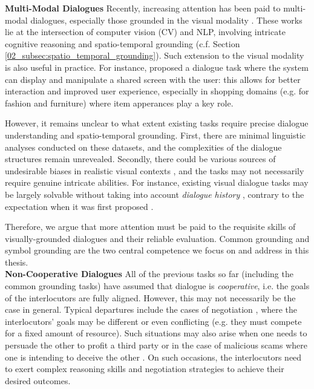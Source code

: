 \noindent
\textbf{Multi-Modal Dialogues}\quad
Recently, increasing attention has been paid to multi-modal dialogues, especially those grounded in the visual modality \citep{das2017visual,de2017guesswhat,alamri2019audio}. These works lie at the intersection of computer vision (CV) and NLP, involving intricate cognitive reasoning \citep{zellers2019recognition} and spatio-temporal grounding (c.f. Section \ref{02_subsec:spatio_temporal_grounding}). Such extension to the visual modality is also useful in practice. For instance, \citet{moon-etal-2020-situated} proposed a dialogue task where the system can display and manipulate a shared screen with the user: this allows for better interaction and improved user experience, especially in shopping domains (e.g. for fashion and furniture) where item apperances play a key role.


However, it remains unclear to what extent existing tasks require precise dialogue understanding and spatio-temporal grounding. First, there are minimal linguistic analyses conducted on these datasets, and the complexities of the dialogue structures remain unrevealed. Secondly, there could be various sources of undesirable biases in realistic visual contexts \citep{goyal2017making,cirik-etal-2018-visual}, and the tasks may not necessarily require genuine intricate abilities. For instance, existing visual dialogue tasks may be largely solvable without taking into account \textit{dialogue history} \citep{agarwal-etal-2020-history}, contrary to the expectation when it was first proposed \citep{das2017visual}.

Therefore, we argue that more attention must be paid to the requisite skills of visually-grounded dialogues and their reliable evaluation. Common grounding and symbol grounding are the two central competence we focus on and address in this thesis.
\\

\noindent
\textbf{Non-Cooperative Dialogues}\quad
All of the previous tasks so far (including the common grounding tasks) have assumed that dialogue is \textit{cooperative}, i.e. the goals of the interlocutors are fully aligned. However, this may not necessarily be the case in general. Typical departures include the cases of negotiation \citep{lewis-etal-2017-deal,he-etal-2018-decoupling,li2020noncollaborative}, where the interlocutors' goals may be different or even conflicting (e.g. they must compete for a fixed amount of resource). Such situations may also arise when one needs to persuade the other to profit a third party \citep{wang-etal-2019-persuasion} or in the case of malicious scams where one is intending to deceive the other \citep{li2020noncollaborative}. On such occasions, the interlocutors need to exert complex reasoning skills and negotiation strategies to achieve their desired outcomes.

